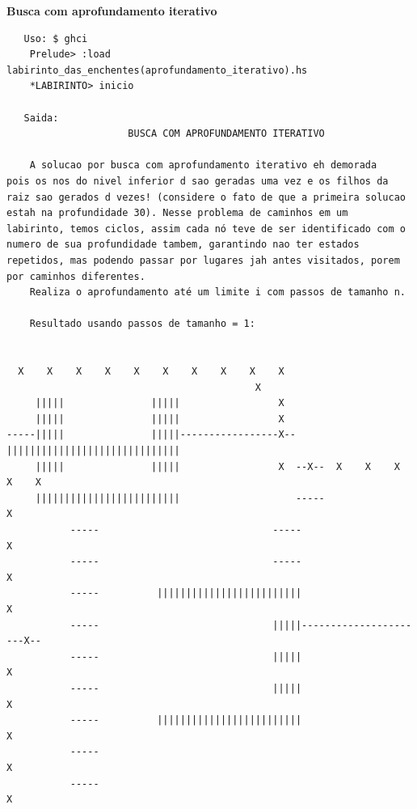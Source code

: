 \documentclass[10pt]{article}
\begin{document}
\textbf{Busca com aprofundamento iterativo}
\begin{verbatim}
   Uso: $ ghci
	Prelude> :load labirinto_das_enchentes(aprofundamento_iterativo).hs
	*LABIRINTO> inicio

   Saida:
		             BUSCA COM APROFUNDAMENTO ITERATIVO

	A solucao por busca com aprofundamento iterativo eh demorada
pois os nos do nivel inferior d sao geradas uma vez e os filhos da
raiz sao gerados d vezes! (considere o fato de que a primeira solucao
estah na profundidade 30). Nesse problema de caminhos em um
labirinto, temos ciclos, assim cada nó teve de ser identificado com o
numero de sua profundidade tambem, garantindo nao ter estados
repetidos, mas podendo passar por lugares jah antes visitados, porem
por caminhos diferentes.
	Realiza o aprofundamento até um limite i com passos de tamanho n.

	Resultado usando passos de tamanho = 1:


  X    X    X    X    X    X    X    X    X    X
	                                       X
     |||||               |||||                 X
     |||||               |||||                 X
-----|||||               |||||-----------------X--||||||||||||||||||||||||||||||
     |||||               |||||                 X  --X--  X    X    X    X    X
     |||||||||||||||||||||||||                    -----                      X
	       -----                              -----                      X
	       -----                              -----                      X
	       -----          |||||||||||||||||||||||||                      X
	       -----                              |||||----------------------X--
	       -----                              |||||                      X
	       -----                              |||||                      X
	       -----          |||||||||||||||||||||||||                      X
	       -----                                                         X
	       -----                                                         X
\end{verbatim}
\pagebreak
\end{document}
